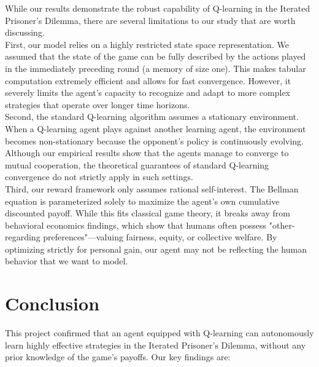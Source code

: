 \documentclass[11pt, a4paper]{article}
\begin{document}
While our results demonstrate the robust capability of Q-learning in the Iterated Prisoner's Dilemma, there are several limitations to our study that are worth discussing. \\

First, our model relies on a highly restricted state space representation. We assumed that the state of the game can be fully described by the actions played in the immediately preceding round (a memory of size one). This makes tabular computation extremely efficient and allows for fast convergence. However, it severely limits the agent's capacity to recognize and adapt to more complex strategies that operate over longer time horizons.\\ 

Second, the standard Q-learning algorithm assumes a stationary environment. When a Q-learning agent plays against another learning agent, the environment becomes non-stationary because the opponent's policy is continuously evolving. Although our empirical results show that the agents manage to converge to mutual cooperation, the theoretical guarantees of standard Q-learning convergence do not strictly apply in such settings.\\

Third, our reward framework only assumes rational self-interest. The Bellman equation is parameterized solely to maximize the agent's own cumulative discounted payoff. While this fits classical game theory, it breaks away from behavioral economics findings, which show that humans often possess "other-regarding preferences"---valuing fairness, equity, or collective welfare. By optimizing strictly for personal gain, our agent may not be reflecting the human behavior that we want to model.


\section{Conclusion}
\label{sec:conclusion}

This project confirmed that an agent equipped with Q-learning can autonomously learn highly effective strategies in the Iterated Prisoner's Dilemma, without any prior knowledge of the game's payoffs. Our key findings are:
\end{document}

